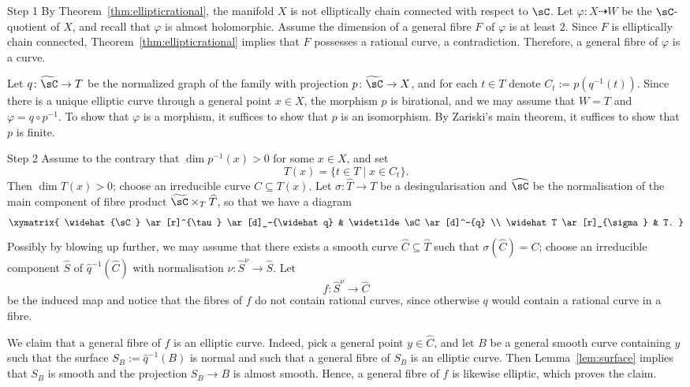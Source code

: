 \begin{proofc}
\begin{step}{Step 1}
By Theorem~\ref{thm:ellipticrational}, the manifold $X$ is not elliptically chain connected with respect to $\sC$. Let $\varphi\colon X \dasharrow W$ be the $\sC$-quotient of $X$, and recall that $\varphi$ is almost holomorphic. Assume the dimension of a general fibre $F$ of $\varphi$ is at least $2$. Since $F$ is elliptically chain connected, Theorem~\ref{thm:ellipticrational} implies that $F$ possesses a rational curve, a contradiction. Therefore, a general fibre of $\varphi$ is a curve.

Let $q\colon \widetilde \sC \to T$ be the normalized graph of the family with projection $p\colon \widetilde \sC \to X$, and for each $t\in T$ denote $C_t:=p(q^{-1}(t))$. Since there is a unique elliptic curve through a general point $x \in X$, the morphism $p$ is birational, and we may assume that $W = T$ and $\varphi=q\circ p^{-1}$. To show that $\varphi$ is a morphism, it suffices to show that $p$ is an isomorphism. By Zariski's main theorem, it suffices to show that $p$ is finite.
\end{step}
\goodbreak
\begin{step}{Step 2}
Assume to the contrary that $\dim p^{-1}(x) > 0$ for some $x \in X$, and set
\[
T(x) = \{t \in T \mid x \in C_t \}.
\]
Then $\dim T(x) > 0$; choose an irreducible curve $C \subseteq T(x)$. Let $\sigma\colon \widehat T \to T$ be a desingularisation and $\widehat \sC$ be the normalisation of the main component of fibre product $\widetilde \sC \times_T \widehat T$, so that we have a diagram
\[
\xymatrix{
\widehat{\sC} \ar[r]^{\tau} \ar[d]_-{\widehat q} & \widetilde \sC \ar[d]^-{q} \\
\widehat T \ar[r]_{\sigma} & T. }
\]
Possibly by blowing up further, we may assume that there exists a smooth curve $\widehat C \subseteq \widehat T$ such that $\sigma (\widehat C) = C$; choose an irreducible component $\widehat S$ of $\widehat q^{-1}(\widehat C)$ with normalisation $\nu\colon\widehat{S}^\nu \to \widehat S$. Let
\[
f\colon \widehat S^\nu \to \widehat C
\]
be the induced map and notice that the fibres of $f$ do not contain rational curves, since otherwise $q$ would contain a rational curve in a fibre.

We claim that a general fibre of $f$ is an elliptic curve. Indeed, pick a general point $y \in \widehat C$, and let $B$ be a general smooth curve containing $y$ such that the surface $S_B := \widehat q^{-1}(B)$ is normal and such that a general fibre of $S_B$ is an elliptic curve. Then Lemma~\ref{lem:surface} implies that $S_B$ is smooth and the projection $S_B \to B$ is almost smooth. Hence, a general fibre of $f$ is likewise elliptic, which proves the claim.


\end{step}
\end{proofc}
